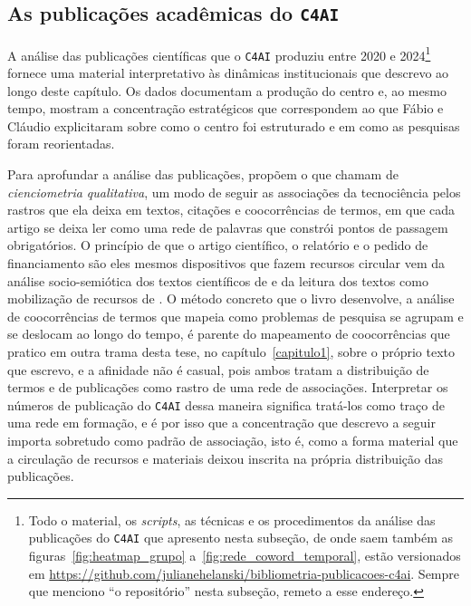 \subsection{As publicações acadêmicas do \texttt{C4AI}}

A análise das publicações científicas que o \texttt{C4AI} produziu entre 2020 e 2024\footnote{Todo o material, os \emph{scripts}, as técnicas e os procedimentos da análise das publicações do \texttt{C4AI} que apresento nesta subseção, de onde saem também as figuras~\ref{fig:heatmap_grupo} a~\ref{fig:rede_coword_temporal}, estão versionados em \url{https://github.com/julianehelanski/bibliometria-publicacoes-c4ai}. Sempre que menciono \enquote{o repositório} nesta subseção, remeto a esse endereço.} fornece uma material interpretativo às dinâmicas institucionais que descrevo ao longo deste capítulo. Os dados documentam a produção do centro e, ao mesmo tempo, mostram a concentração estratégicos que correspondem ao que Fábio e Cláudio explicitaram sobre como o centro foi estruturado e em como as pesquisas foram reorientadas. 

Para aprofundar a análise das publicações, \textcite{Callon1986Qualitative} propõem o que chamam de \textit{cienciometria qualitativa}, um modo de seguir as associações da tecnociência pelos rastros que ela deixa em textos, citações e coocorrências de termos, em que cada artigo se deixa ler como uma rede de palavras que constrói pontos de passagem obrigatórios. O princípio de que o artigo científico, o relatório e o pedido de financiamento são eles mesmos dispositivos que fazem recursos circular vem da análise socio-semiótica dos textos científicos de \textcite{LatourBastide1986Writing} e da leitura dos textos como mobilização de recursos de \textcite{Rip1986Mobilising}. O método concreto que o livro desenvolve, a análise de coocorrências de termos que mapeia como problemas de pesquisa se agrupam e se deslocam ao longo do tempo, é parente do mapeamento de coocorrências que pratico em outra trama desta tese, no capítulo~\ref{capitulo1}, sobre o próprio texto que escrevo, e a afinidade não é casual, pois ambos tratam a distribuição de termos e de publicações como rastro de uma rede de associações. Interpretar os números de publicação do \texttt{C4AI} dessa maneira significa tratá-los como traço de uma rede em formação, e é por isso que a concentração que descrevo a seguir importa sobretudo como padrão de associação, isto é, como a forma material que a circulação de recursos e materiais deixou inscrita na própria distribuição das publicações.


